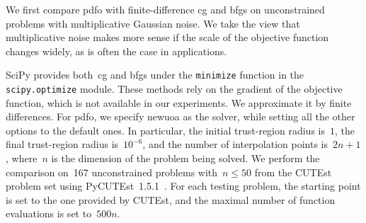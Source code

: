 \documentclass[
    smallextended,  %
    final,          %
]{svjour3}
\newcommand{\modified}[1]{\texorpdfstring{{\color{RoyalBlue}#1}}{#1}}
\begin{document}
We first compare \gls{pdfo} with finite-difference \gls{cg} and \gls{bfgs} on unconstrained problems with multiplicative Gaussian noise.
We take the view that multiplicative noise makes more sense if the scale of the objective function changes widely, as is often the case in applications.

SciPy provides both~\gls{cg} and \gls{bfgs} under the \texttt{minimize} function in the \texttt{scipy.optimize} module.
\modified{
    These methods rely on the gradient of the objective function, which is not available in our experiments.
    We approximate it by finite differences.
}
For \gls{pdfo}, we specify \gls{newuoa} as the solver, while setting all the other options to the default ones.
In particular, the initial trust-region radius is~$1$, the final trust-region radius is~$10^{-6}$, and the number of interpolation points is~$2n + 1$, \modified{where}~$n$ \modified{is} the dimension of the problem being solved.
We perform the comparison on~\modified{\num{167}} unconstrained problems with~$n \le 50$ from the CUTEst~\cite{Gould_Orban_Toint_2015} problem set using PyCUTEst~\modified{1.5.1}~\cite{Fowkes_Roberts_Burmen_2022}.
For each testing problem, the starting point is set to the one provided by CUTEst, and the maximal number of function evaluations is set to~$500n$.
\end{document}
